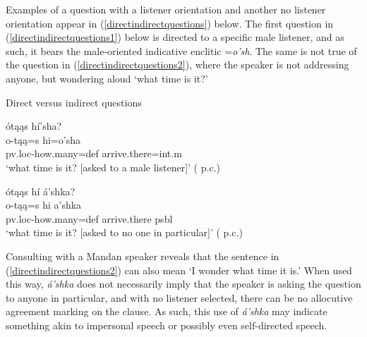 Examples of a question with a listener orientation and another no listener orientation appear in (\ref{directindirectquestions}) below. The first question in (\ref{directindirectquestions1}) below is directed to a specific male listener, and as such, it bears the male-oriented indicative enclitic =\textit{o'sh}. The same is not true of the question in (\ref{directindirectquestions2}), where the speaker is not addressing anyone, but wondering aloud `what time is it?' 

\begin{exe}

\item\label{directindirectquestions} Direct versus indirect questions

	\begin{xlist}
	
	\item\label{directindirectquestions1}
	\glll ótąąs hí'sha?\\
	o-tąą=s hi=o'sha\\
	pv.loc-\textnormal{how.many}=def \textnormal{arrive.there}=int.m\\
	\glt `what time is it? [asked to a male listener]' (\citeauthor{benson2000} p.c.)
	
	\item\label{directindirectquestions2}
	\glll ótąąs hí á'shka?\\
	o-tąą=s hi a'shka\\
	pv.loc-\textnormal{how.many}=def \textnormal{arrive.there} psbl\\
	\glt `what time is it? [asked to no one in particular]' (\citeauthor{benson2000} p.c.)
	\end{xlist}

\end{exe}

Consulting with a Mandan speaker reveals that the sentence in (\ref{directindirectquestions2}) can also mean `I wonder what time it is.' When used this way, \textit{á'shka} does not necessarily imply that the speaker is asking the question to anyone in particular, and with no listener selected, there can be no allocutive agreement marking on the clause. As such, this use of \textit{á'shka} may indicate something akin to impersonal speech or possibly even self-directed speech.
\newpage

